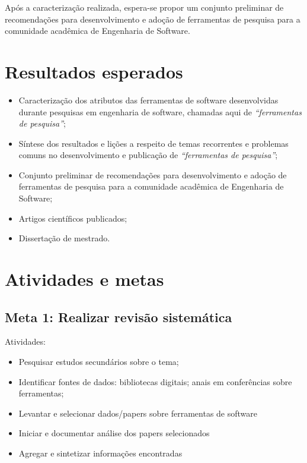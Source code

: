 \documentclass[12pt]{article}
\begin{document}
Após a caracterização realizada, espera-se propor um conjunto preliminar de
recomendações para desenvolvimento e adoção de ferramentas de pesquisa para a
comunidade acadêmica de Engenharia de Software.

\section{Resultados esperados}

\begin{itemize}
  \item Caracterização dos atributos das ferramentas de software desenvolvidas
    durante pesquisas em engenharia de software, chamadas aqui de {\it “ferramentas
    de pesquisa”};
  \item Síntese dos resultados e lições a respeito de temas recorrentes e
    problemas comuns no desenvolvimento e publicação de {\it “ferramentas de
    pesquisa”};
  \item Conjunto preliminar de recomendações para desenvolvimento e adoção de
    ferramentas de pesquisa para a comunidade acadêmica de Engenharia de
    Software;
  \item Artigos científicos publicados;
  \item Dissertação de mestrado.
\end{itemize}


\section{Atividades e metas}

\subsection{Meta 1: Realizar revisão sistemática}

Atividades:

\begin{itemize}
  \item Pesquisar estudos secundários sobre o tema;
  \item Identificar fontes de dados: bibliotecas digitais; anais em
    conferências sobre ferramentas;
  \item Levantar e selecionar dados/papers sobre ferramentas de software
  \item Iniciar e documentar análise dos papers selecionados
  \item Agregar e sintetizar informações encontradas
\end{itemize}
\end{document}

